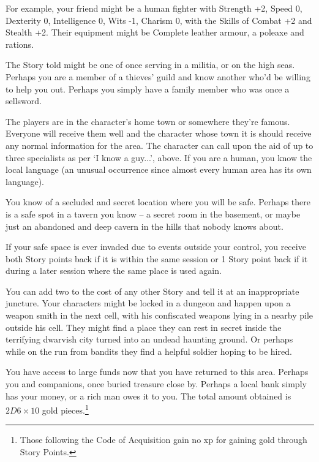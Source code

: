\begin{multicols}{2}
For example, your friend might be a human fighter with Strength +2, Speed 0, Dexterity 0, Intelligence 0, Wits -1, Charism 0, with the Skills of Combat +2 and Stealth +2. Their equipment might be Complete leather armour, a poleaxe and rations.

The Story told might be one of once serving in a militia, or on the high seas. Perhaps you are a member of a thieves' guild and know another who'd be willing to help you out. Perhaps you simply have a family member who was once a sellsword.

The players are in the character's home town or somewhere they're famous. Everyone will receive them well and the character whose town it is should receive any normal information for the area. The character can call upon the aid of up to three specialists as per `I know a guy...', above. If you are a human, you know the local language (an unusual occurrence since almost every human area has its own language).

You know of a secluded and secret location where you will be safe. Perhaps there is a safe spot in a tavern you know -- a secret room in the basement, or maybe just an abandoned and deep cavern in the hills that nobody knows about.

If your safe space is ever invaded due to events outside your control, you receive both Story points back if it is within the same session or 1 Story point back if it during a later session where the same place is used again.

You can add two to the cost of any other Story and tell it at an inappropriate juncture. Your characters might be locked in a dungeon and happen upon a weapon smith in the next cell, with his confiscated weapons lying in a nearby pile outside his cell. They might find a place they can rest in secret inside the terrifying dwarvish city turned into an undead haunting ground. Or perhaps while on the run from bandits they find a helpful soldier hoping to be hired.

You have access to large funds now that you have returned to this area.
Perhaps you and companions, once buried treasure close by.
Perhaps a local bank simply has your money, or a rich man owes it to you.
The total amount obtained is $2D6 \times 10$ gold pieces.\footnote{Those following the Code of Acquisition gain no \gls{xp} for gaining gold through Story Points.}


\end{multicols}

